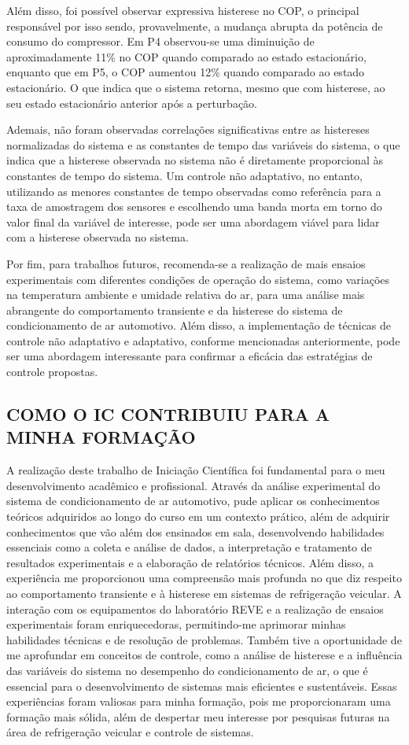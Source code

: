 Além disso, foi possível observar expressiva histerese no COP, o principal responsável por isso sendo, provavelmente, a mudança abrupta da potência de consumo do compressor. Em P4  observou-se uma diminuição de aproximadamente 11\% no COP quando comparado ao estado estacionário, enquanto que em P5, o COP aumentou 12\% quando comparado ao estado estacionário.  O que indica que o sistema retorna, mesmo que com histerese, ao seu estado estacionário anterior após a perturbação.

Ademais, não foram observadas correlações significativas entre as histereses normalizadas do sistema e as constantes de tempo das variáveis do sistema, o que indica que a histerese observada no sistema não é diretamente proporcional às constantes de tempo do sistema. Um controle não adaptativo, no entanto, utilizando as menores constantes de tempo observadas como referência para a taxa de amostragem dos sensores e escolhendo uma banda morta em torno do valor final da variável de interesse, pode ser uma abordagem viável para lidar com a histerese observada no sistema.

Por fim, para trabalhos futuros, recomenda-se a realização de mais ensaios experimentais com diferentes condições de operação do sistema, como variações na temperatura ambiente e umidade relativa do ar, para uma análise mais abrangente do comportamento transiente e da histerese do sistema de condicionamento de ar automotivo. Além disso, a implementação de técnicas de controle não adaptativo e adaptativo, conforme mencionadas anteriormente, pode ser uma abordagem interessante para confirmar a eficácia das estratégias de controle propostas.

\subsection{\MakeUppercase{ Como o IC Contribuiu para a Minha Formação}}

A realização deste trabalho de Iniciação Científica foi fundamental para o meu desenvolvimento acadêmico e profissional. Através da análise experimental do sistema de condicionamento de ar automotivo, pude aplicar os conhecimentos teóricos adquiridos ao longo do curso em um contexto prático, além de adquirir conhecimentos que vão além dos ensinados em sala, desenvolvendo habilidades essenciais como a coleta e análise de dados, a interpretação e tratamento de resultados experimentais e a elaboração de relatórios técnicos.  Além disso, a experiência me proporcionou uma compreensão mais profunda no que diz respeito ao comportamento transiente e à histerese em sistemas de refrigeração veicular. A interação com os equipamentos do laboratório REVE e a realização de ensaios experimentais foram enriquecedoras, permitindo-me aprimorar minhas habilidades técnicas e de resolução de problemas. Também tive a oportunidade de me aprofundar em conceitos de controle, como a análise de histerese e a influência das variáveis do sistema no desempenho do condicionamento de ar, o que é essencial para o desenvolvimento de sistemas mais eficientes e sustentáveis.
Essas experiências foram valiosas para minha formação, pois me proporcionaram uma formação mais sólida, além de despertar meu interesse por pesquisas futuras na área de refrigeração veicular e controle de sistemas. 

